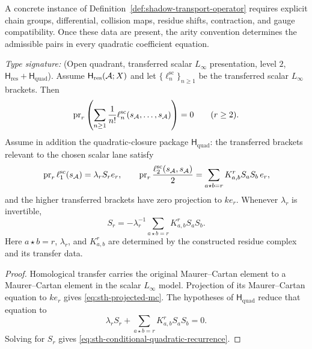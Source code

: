 \begin{remark}
\label{rem:sth-why-range}
A concrete instance of Definition~\ref{def:shadow-transport-operator}
requires explicit chain groups, differential, collision maps,
residue shifts, contraction, and gauge compatibility.  Once these
data are present, the arity convention determines the admissible
pairs in every quadratic coefficient equation.
\end{remark}

\begin{theorem}
\ClaimStatusConditional
\label{thm:virasoro-shadow-recurrence}
\emph{Type signature:}
\textup{(Open quadrant, transferred scalar \(L_\infty\)
presentation, level \(2\),
\(\mathsf H_{\mathrm{res}}+\mathsf H_{\mathrm{quad}}\)).}
Assume $\mathsf H_{\mathrm{res}}(\mathcal A;X)$ and let
$\{\ell_n^{\mathrm{sc}}\}_{n\ge1}$ be the transferred scalar
$L_\infty$ brackets.  Then
\begin{equation}
 \operatorname{pr}_r
 \left(
   \sum_{n\ge1}\frac1{n!}
   \ell_n^{\mathrm{sc}}(s_\mathcal A,\ldots,s_\mathcal A)
 \right)=0
 \qquad (r\ge2).
 \label{eq:sth-projected-mc}
\end{equation}
Assume in addition the quadratic-closure package
$\mathsf H_{\mathrm{quad}}$: the transferred brackets relevant to
the chosen scalar lane satisfy
\[
 \operatorname{pr}_r\ell_1^{\mathrm{sc}}(s_\mathcal A)=\lambda_rS_r e_r,
 \qquad
 \operatorname{pr}_r\frac{\ell_2^{\mathrm{sc}}(s_\mathcal A,s_\mathcal A)}2
 =\sum_{a\star b=r}K^r_{a,b}S_aS_b\,e_r,
\]
and the higher transferred brackets have zero projection to $ke_r$.
Whenever $\lambda_r$ is invertible,
\begin{equation}
 S_r=-\lambda_r^{-1}
 \sum_{a\star b=r}K^r_{a,b}S_aS_b.
 \label{eq:sth-conditional-quadratic-recurrence}
\end{equation}
Here $a\star b=r$, $\lambda_r$, and $K^r_{a,b}$ are determined by
the constructed residue complex and its transfer data.
\end{theorem}

\begin{proof}
Homological transfer carries the original Maurer--Cartan element to
a Maurer--Cartan element in the scalar $L_\infty$ model.  Projection
of its Maurer--Cartan equation to $ke_r$ gives
\eqref{eq:sth-projected-mc}.  The hypotheses of
$\mathsf H_{\mathrm{quad}}$ reduce that equation to
\[
 \lambda_rS_r+\sum_{a\star b=r}K^r_{a,b}S_aS_b=0.
\]
Solving for $S_r$ gives
\eqref{eq:sth-conditional-quadratic-recurrence}.
\end{proof}

